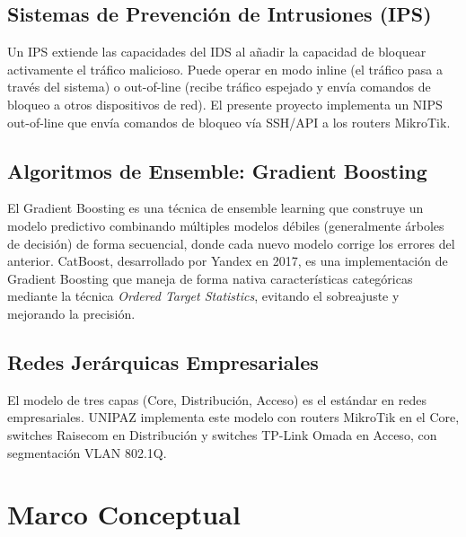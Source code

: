 \documentclass[12pt,letterpaper]{report}
\begin{document}
\subsection{Sistemas de Prevención de Intrusiones (IPS)}

Un IPS extiende las capacidades del IDS al añadir la capacidad de bloquear activamente el tráfico malicioso. Puede operar en modo inline (el tráfico pasa a través del sistema) o out-of-line (recibe tráfico espejado y envía comandos de bloqueo a otros dispositivos de red). El presente proyecto implementa un NIPS out-of-line que envía comandos de bloqueo vía SSH/API a los routers MikroTik.

\subsection{Algoritmos de Ensemble: Gradient Boosting}

El Gradient Boosting es una técnica de ensemble learning que construye un modelo predictivo combinando múltiples modelos débiles (generalmente árboles de decisión) de forma secuencial, donde cada nuevo modelo corrige los errores del anterior. CatBoost, desarrollado por Yandex en 2017, es una implementación de Gradient Boosting que maneja de forma nativa características categóricas mediante la técnica \textit{Ordered Target Statistics}, evitando el sobreajuste y mejorando la precisión.

\subsection{Redes Jerárquicas Empresariales}

El modelo de tres capas (Core, Distribución, Acceso) es el estándar en redes empresariales. UNIPAZ implementa este modelo con routers MikroTik en el Core, switches Raisecom en Distribución y switches TP-Link Omada en Acceso, con segmentación VLAN 802.1Q.

\section{Marco Conceptual}
\end{document}

